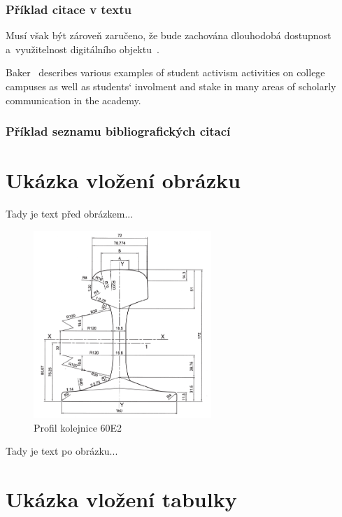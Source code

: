 \documentclass[12pt,a4paper]{report}															%
\begin{document}
\subsection{Příklad citace v textu}

Musí však být zároveň zaručeno, že bude zachována dlouhodobá dostupnost a~využitelnost digitálního objektu~\cite{bor1}.

Baker~\cite{bak1} describes various examples of student activism activities on college campuses as well as students‘ involment and stake in many areas of scholarly communication in the academy.

\subsection{Příklad seznamu bibliografických citací}

\printbibliography[heading=none]																%

\chapter{Ukázka vložení obrázku}
\label{chap:uvo}

Tady je text před obrázkem...

\begin{figure}[h]

  \centering
  \includegraphics[width=0.6\textwidth]{60E2}
  \caption{Profil kolejnice 60E2~\cite{csn1}}
  \label{fig:60E2}
  
\end{figure}

Tady je text po obrázku...

\chapter{Ukázka vložení tabulky}
\label{chap:uvt}
\end{document}
